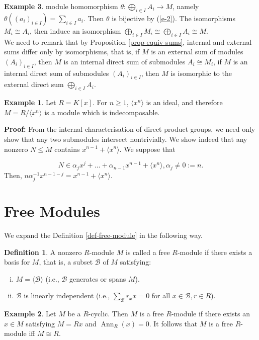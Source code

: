 \documentclass[11pt]{amsbook}%
\newcommand{\ii}{\item}
\theoremstyle{plain}
\theoremstyle{definition}
\newtheorem{definition*}{Definition}
\newtheorem*{example*}{Example}
\numberwithin{equation}{section}
\newcommand{\BC}{\mathcal B}
\renewcommand{\proof}{ \textbf{Proof: }}
\renewcommand{\ie}{i.e., }
\DeclareMathOperator{\Ann}{Ann}
\begin{document}
\begin{example*}
module homomorphism $\theta: \bigoplus_{i \in I} A_{i} \longrightarrow M$, namely $\theta((a_{i})_{i \in I}) = \sum_{i \in I} a_{i}$.
Then $\theta$ is bijective by (\ref{e-2}). The isomorphisms $M_{i} \cong A_{i}$, then induce an
isomorphism $\bigoplus_{i \in I} M_{i} \cong \bigoplus_{i \in I} A_{i} \cong M$. \qedsymbol \\
We need to remark that by Proposition \ref{prop-equiv-sums}, internal and external sums differ
only by isomorphisms, that is, if $M$ is an external sum of modules $(A_{i})_{i \in I}$, then $M$
is an internal direct sum of submodules $A_{i} \cong M_{i}$, if $M$ is an internal direct sum
of submodules $(A_{i})_{i \in I}$, then $M$ is isomorphic to the external direct sum $\bigoplus_{i \in I} A_{i}$.

\begin{example*}
  Let $R = K[x]$. For $n \geq 1$, $\langle x^{n} \rangle$ is an ideal, and therefore $M = R/\langle x^{n} \rangle$ 
  is a module which is indecomposable.
\end{example*}
\proof  From the internal characterisation of direct product groups, we need only show that any
two submodules intersect nontrivially. We show indeed that any nonzero $N \leq M$ contains
$x^{n-1} + \langle x^{n} \rangle$. We suppose that

$$
N \in \alpha_{j}x^{j} + \dots + \alpha_{n-1}x^{n-1} + \langle x^{n} \rangle, \alpha_{j} \neq 0 := n.
$$
Then, $n\alpha_{j}^{-1}x^{n-1-j} = x^{n-1} + \langle x^{n} \rangle$. \qedsymbol


\section{Free Modules}
We expand the Definition \ref{def-free-module} in the following way.
\begin{definition*}
  \label{def-expand-free-module}
  A nonzero $R$-module $M$ is called a free $R$-module if there exists a basis
  for $M$, that is, a subset $\BC$ of $M$ satisfying:
  \begin{enumerate}[(i) ]
      \ii $M = \langle \BC \rangle$ (\ie $\BC$ generates or spans $M$).
      \ii $\BC$ is linearly independent (\ie $\sum_{\BC} r_{x}x = 0$ for all $x \in \BC, r \in R$).
  \end{enumerate}
\end{definition*}

\begin{example*}
  Let $M$ be a $R$-cyclic. Then $M$ is a free $R$-module if there exists an $x \in M$
  satisfying $M = Rx$ and $\Ann_{R}(x) = 0$. It follows that $M$ is a free $R$-module
  iff $M \cong R$.
\end{example*}


\end{example*}
\end{document}

